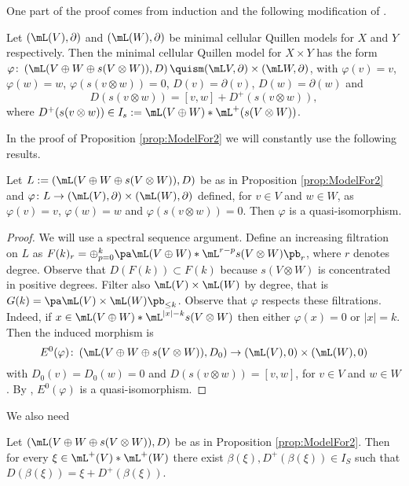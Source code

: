 One part of the proof comes from induction and the following modification of \cite[VII.1.(2)]{Tanre}.

\begin{proposition}\label{prop:ModelFor2}
	Let $(\mL (V),\partial)$ and $(\mL (W),\partial)$ be minimal cellular Quillen models for $X$ and $Y$ respectively. Then the minimal cellular Quillen model for $X\times Y$ has the form $\varphi\colon \left(\mL (V\oplus W\oplus s(V\otimes W)), D\right)\quism (\mL V,\partial)\times (\mL W,\partial)$, with $\varphi(v)=v$, $\varphi(w)=w$, $\varphi(s(v\otimes w))=0$, $D(v)=\partial(v)$, $D(w)=\partial(w)$ and \[D(s(v\otimes w))=[v,w]+D^+(s(v\otimes w)),\] where $D^+(s(v\otimes w))\in I_s:=\mL (V\oplus W)*\mL^+(s(V\otimes W))$.
\end{proposition}

In the proof of Proposition \ref{prop:ModelFor2} we will constantly use the following results.

\begin{lemma}\label{lemma:Quism}
	Let $L:=\left(\mL (V\oplus W\oplus s(V\otimes W)), D\right)$ be as in Proposition \ref{prop:ModelFor2} and $\varphi\colon L\rightarrow (\mL (V),\partial)\times (\mL (W),\partial)$ defined, for $v\in V$ and $w\in W$, as $\varphi(v)=v$, $\varphi(w)=w$ and $\varphi(s(v\otimes w))=0$. Then $\varphi$ is a quasi-isomorphism.
\end{lemma}
\begin{proof}
	We will use a spectral sequence argument. Define an increasing filtration on $L$ as $F(k)_r=\oplus_{p=0}^k\pa\mL(V\oplus W)*\mL^{r-p}s(V\otimes W)\pb_r$, where $r$ denotes degree. Observe that $D(F(k))\subset F(k)$ because $s(V\otimes W)$ is concentrated in positive degrees. Filter also $\mL (V)\times \mL (W)$ by degree, that is $G(k)=\pa\mL (V)\times \mL (W)\pb_{\le k}$. Observe that $\varphi$ respects these filtrations. Indeed, if $x\in\mL(V\oplus W)*\mL^{|x|-k}s(V\otimes W)$ then either $\varphi(x)=0$ or $|x|=k$. Then the induced morphism is \[E^0(\varphi)\colon \left(\mL (V\oplus W\oplus s(V\otimes W)), D_0\right)\rightarrow (\mL (V),0)\times (\mL (W),0)\]
	with $D_0(v)=D_0(w)=0$ and $D(s(v\otimes w))=[v,w]$, for $v\in V$ and $w\in W$. By \cite[VII.7. (10)]{Tanre}, $E^0(\varphi)$ is a quasi-isomorphism.
\end{proof}

We also need
\begin{lemma}\label{lemma:Existence}
	Let $\left(\mL (V\oplus W\oplus s(V\otimes W)), D\right)$ be as in Proposition \ref{prop:ModelFor2}. Then for every $\xi\in \mL^+(V)*\mL^+(W)$ there exist $\beta(\xi),D^+(\beta(\xi))\in I_S$ such that $D(\beta(\xi))=\xi+D^+(\beta(\xi))$.
\end{lemma}

